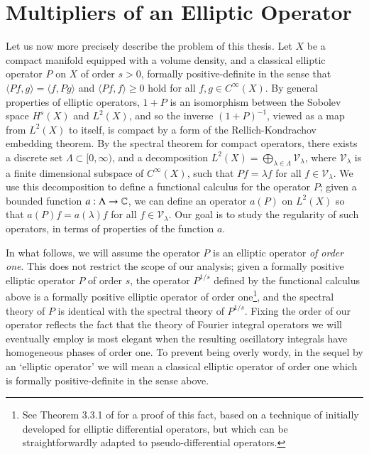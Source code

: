
\chapter{Multipliers of an Elliptic Operator} \label{cha:multipliers_of_an_elliptic_operator}

Let us now more precisely describe the problem of this thesis. Let $X$ be a compact manifold equipped with a volume density, and a classical elliptic operator $P$ on $X$ of order $s > 0$, formally positive-definite in the sense that $\langle Pf, g \rangle = \langle f, Pg \rangle$ and $\langle Pf, f \rangle \geq 0$ hold for all $f,g \in C^\infty(X)$. By general properties of elliptic operators, $1 + P$ is an isomorphism between the Sobolev space $H^s(X)$ and $L^2(X)$,
%
%
and so the inverse $(1 + P)^{-1}$, viewed as a map from $L^2(X)$ to itself, is compact by a form of the Rellich-Kondrachov embedding theorem. By the spectral theorem for compact operators, there exists a discrete set $\Lambda \subset [0,\infty)$, and a decomposition $L^2(X) = \bigoplus\nolimits_{\lambda \in \Lambda} \mathcal{V}_\lambda$, where $\mathcal{V}_\lambda$ is a finite dimensional subspace of $C^\infty(X)$, such that $Pf = \lambda f$ for all $f \in \mathcal{V}_\lambda$. We use this decomposition to define a functional calculus for the operator $P$; given a bounded function $a: \Lambda \to \operatorname{\mathbb{C}}$, we can define an operator $a(P)$ on $L^2(X)$ so that $a(P) f = a(\lambda) f$ for all $f \in \mathcal{V}_\lambda$. Our goal is to study the regularity of such operators, in terms of properties of the function $a$.

In what follows, we will assume the operator $P$ is an elliptic operator \emph{of order one}. This does not restrict the scope of our analysis; given a formally positive elliptic operator $P$ of order $s$, the operator $P^{1/s}$ defined by the functional calculus above is a formally positive elliptic operator of order one\footnote{See Theorem 3.3.1 of \cite{Sogge} for a proof of this fact, based on a technique of \cite{Seeley} initially developed for elliptic differential operators, but which can be straightforwardly adapted to pseudo-differential operators.}, and the spectral theory of $P$ is identical with the spectral theory of $P^{1/s}$. Fixing the order of our operator reflects the fact that the theory of Fourier integral operators we will eventually employ is most elegant when the resulting oscillatory integrals have homogeneous phases of order one. To prevent being overly wordy, in the sequel by an `elliptic operator' we will mean a classical elliptic operator of order one which is formally positive-definite in the sense above.

